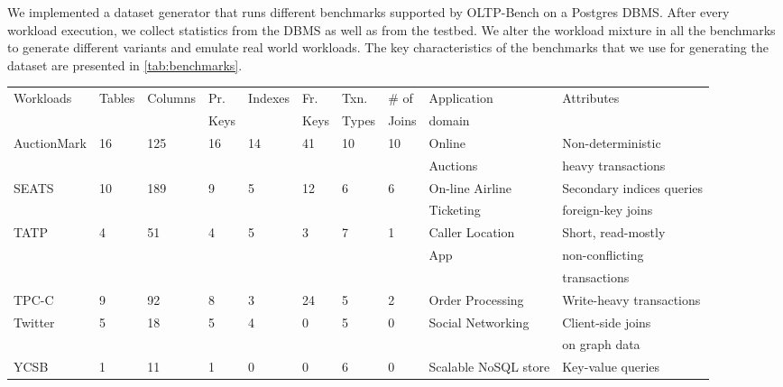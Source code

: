 We implemented a dataset generator that runs different benchmarks supported
by OLTP-Bench on a Postgres DBMS. After every workload execution, we
collect statistics from the DBMS as well as from the testbed. We alter the
workload mixture in all the benchmarks to generate different variants and
emulate real world workloads. The key characteristics of the benchmarks
that we use for generating the dataset are presented in \cref{tab:benchmarks}.

\begin{table*}
\centering
\small{
  \centering
  \begin{tabular}{lllll lllll} \toprule
   Workloads & Tables & Columns & Pr. & Indexes &	Fr. & 
   Txn. & \# of & Application  & Attributes  \\
   & & & Keys & & Keys & Types & Joins  & domain & \\
   \midrule
	AuctionMark 	& 16 	& 125  &	16 &	14 &	41 &	10 &	10 &	Online &
	Non-deterministic\\
	& & & & & & & & Auctions &  heavy transactions \\
	SEATS &	10 &	189 &	9 	& 5 	& 12 	& 6 &	6 &	On-line Airline  &
	Secondary indices queries\\
	& & & & & & & & Ticketing & foreign-key joins \\
	TATP &	4 	& 51 &	4 &	5 &	3 &	7 &	1 &	Caller Location  &	Short, read-mostly\\
	& & & & & & & & App & non-conflicting\\
	& & & & & & & & &  transactions\\
	TPC-C &	9 &	92 &	8 &	3 &	24 &	5 &	2 &	Order Processing & Write-heavy
	transactions\\
	Twitter &	5 &	18 &	5 &	4 &	0 &	5 &	0 &	Social Networking & Client-side joins \\
	& & & & & & & & & on	graph data \\
	YCSB &	1 &	11 &	1 &	0 &	0 &	6 &	0 &	Scalable NoSQL store &	Key-value queries \\
   \bottomrule
   \end{tabular}
 }
\caption{Key characteristics of the benchmarks used in our evaluation. ``Pr. key''
denotes primary key and ``Fr. key'' denotes foreign key.}
\label{tab:benchmarks}
\end{table*}


